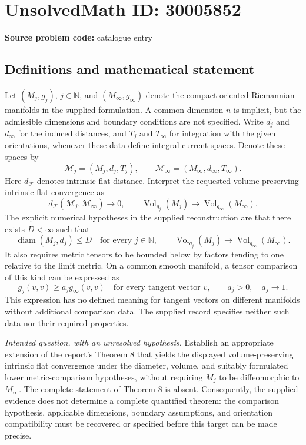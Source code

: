 \documentclass[11pt]{article}
\newcommand{\N}{\mathbb{N}}
\begin{document}
\section*{UnsolvedMath ID: 30005852}
\textbf{Source problem code:} catalogue entry
\subsection{Definitions and mathematical statement}
Let \((M_j,g_j)\), \(j\in\N\), and \((M_\infty,g_\infty)\) denote the compact oriented Riemannian manifolds in the supplied formulation. A common dimension \(n\) is implicit, but the admissible dimensions and boundary conditions are not specified. Write \(d_j\) and \(d_\infty\) for the induced distances, and \(T_j\) and \(T_\infty\) for integration with the given orientations, whenever these data define integral current spaces. Denote these spaces by
\[
\mathcal M_j=(M_j,d_j,T_j),\qquad
\mathcal M_\infty=(M_\infty,d_\infty,T_\infty).
\]
Here \(d_{\mathcal F}\) denotes intrinsic flat distance. Interpret the requested volume-preserving intrinsic flat convergence as
\[
d_{\mathcal F}(\mathcal M_j,\mathcal M_\infty)\longrightarrow0,
\qquad
\operatorname{Vol}_{g_j}(M_j)\longrightarrow
\operatorname{Vol}_{g_\infty}(M_\infty).
\]
The explicit numerical hypotheses in the supplied reconstruction are that there exists \(D<\infty\) such that
\[
\operatorname{diam}(M_j,d_j)\le D\quad\text{for every }j\in\N,
\qquad
\operatorname{Vol}_{g_j}(M_j)\longrightarrow
\operatorname{Vol}_{g_\infty}(M_\infty).
\]
It also requires metric tensors to be bounded below by factors tending to one relative to the limit metric. On a common smooth manifold, a tensor comparison of this kind can be expressed as
\[
g_j(v,v)\ge a_j g_\infty(v,v)
\quad\text{for every tangent vector }v,
\qquad a_j>0,\quad a_j\longrightarrow1.
\]
This expression has no defined meaning for tangent vectors on different manifolds without additional comparison data. The supplied record specifies neither such data nor their required properties.

\emph{Intended question, with an unresolved hypothesis.} Establish an appropriate extension of the report's Theorem 8 that yields the displayed volume-preserving intrinsic flat convergence under the diameter, volume, and suitably formulated lower metric-comparison hypotheses, without requiring \(M_j\) to be diffeomorphic to \(M_\infty\). The complete statement of Theorem 8 is absent. Consequently, the supplied evidence does not determine a complete quantified theorem: the comparison hypothesis, applicable dimensions, boundary assumptions, and orientation compatibility must be recovered or specified before this target can be made precise.
\end{document}
